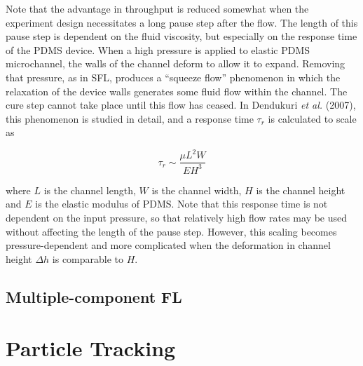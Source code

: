 Note that the advantage in throughput is reduced somewhat when the experiment design necessitates a long pause step
after the flow. The length of this pause step is dependent on the fluid viscosity, but especially on the 
response time of the PDMS device.  When a high pressure is applied to elastic PDMS microchannel, the 
walls of the channel deform to allow it to expand.  Removing that pressure, as in SFL, produces a ``squeeze flow''
phenomenon in which the relaxation of the device walls generates some fluid flow within the channel. The cure step 
cannot take place until this flow has ceased.  In Dendukuri \textit{et al.} (2007), this phenomenon is studied in detail,
and a response time $\tau_r$ is calculated to scale as

\begin{equation}
\tau_r \sim \frac{\mu L^2 W}{EH^3}
\end{equation}

where $L$ is the channel length, $W$ is the channel width, $H$ is the channel height and $E$ is the elastic
modulus of PDMS.  Note that this response time is not dependent on the input pressure, so that relatively high
flow rates may be used without affecting the length of the pause step. However, this scaling becomes pressure-dependent
and more complicated when the deformation in channel height $\Delta h$ is comparable to $H$.~\cite{dendukuri-sfl}

\subsection{Multiple-component FL}

\section{Particle Tracking}

\begin{itemize}
\end{itemize}
